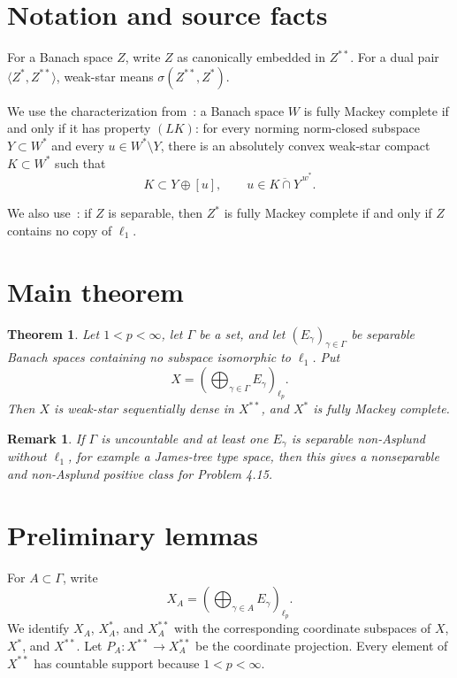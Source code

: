 \documentclass[11pt]{article}
\newtheorem{theorem}{Theorem}
\newtheorem{remark}{Remark}
\newcommand{\ol}{\overline}
\begin{document}
\section*{Notation and source facts}

For a Banach space $Z$, write $Z$ as canonically embedded in $Z^{**}$.
For a dual pair $\langle Z^*,Z^{**}\rangle$, weak-star means
$\sigma(Z^{**},Z^*)$.

We use the characterization from~\cite[Theorem 3.5]{GMR}: a Banach space $W$
is fully Mackey complete if and only if it has property $(LK)$:
for every norming norm-closed subspace $Y\subset W^*$ and every
$u\in W^*\setminus Y$, there is an absolutely convex weak-star compact
$K\subset W^*$ such that
\[
K\subset Y\oplus [u],
\qquad
u\in \ol{K\cap Y}^{\,w^*}.
\]

We also use~\cite[Corollary 4.8]{GMR}: if $Z$ is separable, then $Z^*$ is
fully Mackey complete if and only if $Z$ contains no copy of $\ell_1$.

\section*{Main theorem}

\begin{theorem}\label{thm:main}
Let $1<p<\infty$, let $\Gamma$ be a set, and let
$(E_\gamma)_{\gamma\in\Gamma}$ be separable Banach spaces containing no
subspace isomorphic to $\ell_1$.  Put
\[
X=\left(\bigoplus_{\gamma\in\Gamma} E_\gamma\right)_{\ell_p}.
\]
Then $X$ is weak-star sequentially dense in $X^{**}$, and $X^*$ is fully
Mackey complete.
\end{theorem}

\begin{remark}
If $\Gamma$ is uncountable and at least one $E_\gamma$ is separable
non-Asplund without $\ell_1$, for example a James-tree type space, then this
gives a nonseparable and non-Asplund positive class for Problem 4.15.
\end{remark}

\section*{Preliminary lemmas}

For $A\subset\Gamma$, write
\[
X_A=\left(\bigoplus_{\gamma\in A}E_\gamma\right)_{\ell_p}.
\]
We identify $X_A$, $X_A^*$, and $X_A^{**}$ with the corresponding coordinate
subspaces of $X$, $X^*$, and $X^{**}$.  Let $P_A:X^{**}\to X_A^{**}$ be the
coordinate projection.  Every element of $X^{**}$ has countable support because
$1<p<\infty$.
\end{document}
